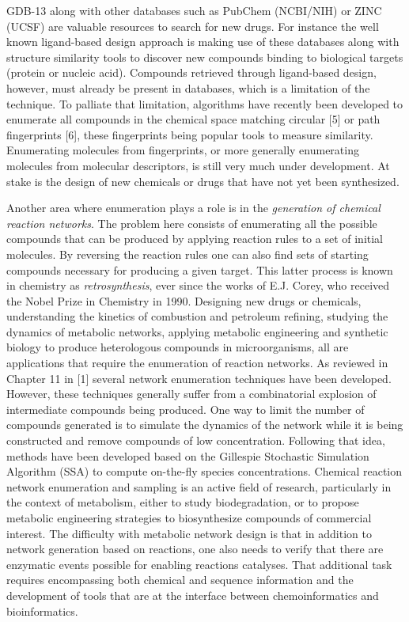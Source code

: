 \documentclass{sig-alternate}
\begin{document}
GDB-13 along with other databases such as PubChem (NCBI/NIH) or ZINC
(UCSF) are valuable resources to search for new drugs. For instance
the well known ligand-based design approach is making use of these
databases along with structure similarity tools to discover new
compounds binding to biological targets (protein or nucleic
acid). Compounds retrieved through ligand-based design, however, must
already be present in databases, which is a limitation of the
technique. To palliate that limitation, algorithms have recently been
developed to enumerate all compounds in the chemical space matching
circular [5] or path fingerprints [6], these fingerprints being
popular tools to measure similarity. Enumerating molecules from
fingerprints, or more generally enumerating molecules from molecular
descriptors, is still very much under development. At stake is the
design of new chemicals or drugs that have not yet been synthesized.

Another area where enumeration plays a role is in the \emph{generation
  of chemical reaction networks}. The problem here consists of
enumerating all the possible compounds that can be produced by
applying reaction rules to a set of initial molecules. By reversing
the reaction rules one can also find sets of starting compounds
necessary for producing a given target. This latter process is known
in chemistry as \emph{retrosynthesis}, ever since the works of
E.J. Corey, who received the Nobel Prize in Chemistry in
1990. Designing new drugs or chemicals, understanding the kinetics of
combustion and petroleum refining, studying the dynamics of metabolic
networks, applying metabolic engineering and synthetic biology to
produce heterologous compounds in microorganisms, all are applications
that require the enumeration of reaction networks. As reviewed in
Chapter 11 in [1] several network enumeration techniques have been
developed. However, these techniques generally suffer from a
combinatorial explosion of intermediate compounds being produced. One
way to limit the number of compounds generated is to simulate the
dynamics of the network while it is being constructed and remove
compounds of low concentration. Following that idea, methods have been
developed based on the Gillespie Stochastic Simulation Algorithm (SSA)
to compute on-the-fly species concentrations. Chemical reaction
network enumeration and sampling is an active field of research,
particularly in the context of metabolism, either to study
biodegradation, or to propose metabolic engineering strategies to
biosynthesize compounds of commercial interest. The difficulty with
metabolic network design is that in addition to network generation
based on reactions, one also needs to verify that there are enzymatic
events possible for enabling reactions catalyses. That additional task
requires encompassing both chemical and sequence information and the
development of tools that are at the interface between
chemoinformatics and bioinformatics.
\end{document}
